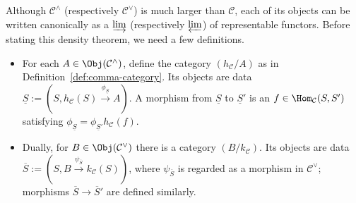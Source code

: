Although $\mathcal{C}^\wedge$ (respectively $\mathcal{C}^\vee$) is much larger than $\mathcal{C}$, each of its objects can be written canonically as a $\varinjlim$ (respectively $\varprojlim$) of representable functors. Before stating this density theorem, we need a few definitions.
\begin{itemize}
	\item For each $A\in\Obj(\mathcal{C}^\wedge)$, define the category $(h_{\mathcal{C}}/A)$ as in Definition~\ref{def:comma-category}. Its objects are data
	$\underline S:=\left(S,h_{\mathcal{C}}(S)\xrightarrow{\phi_{\underline S}}A\right)$.
	A morphism from $\underline S$ to $\underline S'$ is an
	$f\in\Hom_{\mathcal{C}}(S,S')$ satisfying
	$\phi_{\underline S}=\phi_{\underline S'}h_{\mathcal{C}}(f)$.

	\item Dually, for $B\in\Obj(\mathcal{C}^\vee)$ there is a category
	$(B/k_{\mathcal{C}})$. Its objects are data
	$\overline S:=\left(S,B\xrightarrow{\psi_{\overline S}}k_{\mathcal{C}}(S)\right)$,
	where $\psi_{\overline S}$ is regarded as a morphism in $\mathcal{C}^\vee$; morphisms $\overline S\to\overline S'$ are defined similarly.
\end{itemize}


